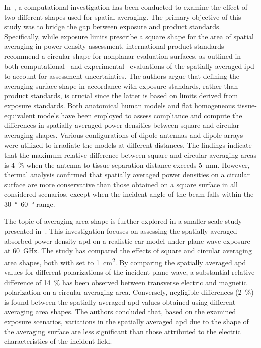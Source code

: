 In~\cite{Morimoto2022Assessment}, a computational investigation has been conducted to examine the effect of two different shapes used for spatial averaging.
The primary objective of this study was to bridge the gap between exposure and product standards.
Specifically, while exposure limits prescribe a square shape for the area of spatial averaging in power density assessment, international product standards recommend a circular shape for nonplanar evaluation surfaces, as outlined in both computational~\cite{IEC63195-2-2022} and experimental~\cite{IEC63195-1-2022} evaluations of the spatially averaged \gls{ipd} to account for assessment uncertainties.
The authors argue that defining the averaging surface shape in accordance with exposure standards, rather than product standards, is crucial since the latter is based on limits derived from exposure standards.
Both anatomical human models and flat homogeneous tissue-equivalent models have been employed to assess compliance and compute the differences in spatially averaged power densities between square and circular averaging shapes.
Various configurations of dipole antennas and dipole arrays were utilized to irradiate the models at different distances.
The findings indicate that the maximum relative difference between square and circular averaging areas is \SI{4}{\percent} when the antenna-to-tissue separation distance exceeds \SI{5}{\mm}.
However, thermal analysis confirmed that spatially averaged power densities on a circular surface are more conservative than those obtained on a square surface in all considered scenarios, except when the incident angle of the beam falls within the \SIrange{30}{60}{\degree} range.

The topic of averaging area shape is further explored in a smaller-scale study presented in~\cite{Kapetanovic2022IMBioc}.
This investigation focuses on assessing the spatially averaged absorbed power density \gls{apd} on a realistic ear model under plane-wave exposure at \SI{60}{\GHz}.
The study has compared the effects of square and circular averaging area shapes, both with set to \SI{1}{\cm\squared}.
By comparing the spatially averaged \gls{apd} values for different polarizations of the incident plane wave, a substantial relative difference of \SI{14}{\percent} has been observed between transverse electric and magnetic polarization on a circular averaging area.
Conversely, negligible differences (\SI{2}{\percent}) is found between the spatially averaged \gls{apd} values obtained using different averaging area shapes.
The authors concluded that, based on the examined exposure scenarios, variations in the spatially averaged \gls{apd} due to the shape of the averaging surface are less significant than those attributed to the electric characteristics of the incident field.